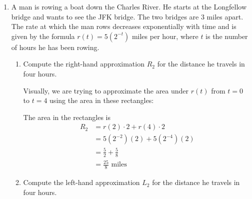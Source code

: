 \documentclass{article}
\begin{document}
\begin{enumerate}
\item


  \label{spring2009-xb-midterm2-1}



  A man is rowing a boat down the Charles River. He starts at the
  Longfellow bridge and wants to see the JFK bridge.  The two bridges
  are 3 miles apart.  The rate at which the man rows decreases
  exponentially with time and is given by the formula $r(t)=
  5\left(2^{-t} \right)$ miles per hour, where $t$ is the number of
  hours he has been rowing.

  \begin{enumerate}
  \item
    \begin{problem}[\vfill]
      Compute the right-hand approximation $R_2$ for the distance he
      travels in four hours.
    \end{problem}

    \begin{solution}
      Visually, we are trying to approximate the area under $r(t)$ from $t
      = 0$ to $t = 4$ using the area in these rectangles:
      \begin{center}
      \end{center}
      The area in the rectangles is
      \begin{align*}
        R_2 &= r(2) \cdot 2 + r(4) \cdot 2 \\
        &= 5(2^{-2})(2) + 5(2^{-4})(2) \\
        &= \frac{5}{2} + \frac{5}{8} \\
        &= \boxed{\frac{25}{8} \text{ miles}}
      \end{align*}
    \end{solution}

  \item
    \begin{problem}[\vfill]
      Compute the left-hand approximation $L_2$ for the distance he
      travels in four hours.
    \end{problem}


\end{enumerate}
\end{enumerate}
\end{document}
